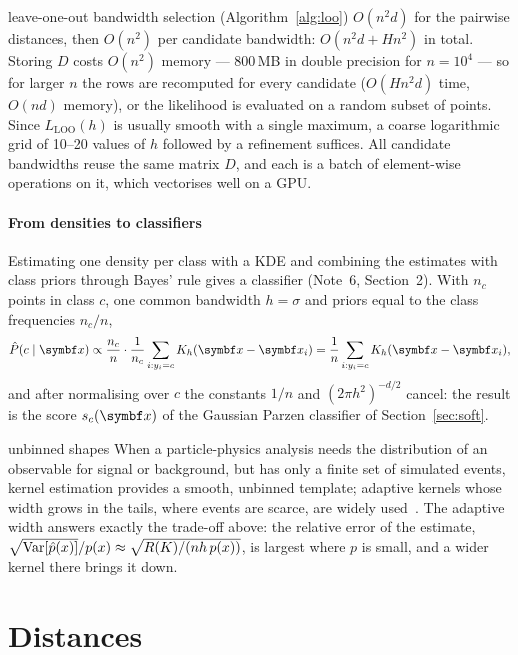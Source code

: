 \documentclass[11pt]{article}
\begin{document}
\begin{runtime}{leave-one-out bandwidth selection (Algorithm~\ref{alg:loo})}
$O(n^2 d)$ for the pairwise distances, then $O(n^2)$ per candidate bandwidth: $O(n^2 d + Hn^2)$ in total. Storing
$D$ costs $O(n^2)$ memory --- 800\,MB in double precision for $n = 10^4$ --- so for larger $n$ the rows are recomputed
for every candidate ($O(Hn^2 d)$ time, $O(nd)$ memory), or the likelihood is evaluated on a random subset of points.
Since $L_{\mathrm{LOO}}(h)$ is usually smooth with a single maximum, a coarse logarithmic grid of 10--20 values of $h$
followed by a refinement suffices. All candidate bandwidths reuse the same matrix $D$, and each is a batch of
element-wise operations on it, which vectorises well on a GPU.
\end{runtime}

\paragraph{From densities to classifiers} Estimating one density per class with a KDE and combining the
estimates with class priors through Bayes' rule gives a classifier (Note~6, Section~2). With $n_c$ points in class
$c$, one common bandwidth $h = \sigma$ and priors equal to the class frequencies $n_c/n$,
\[
  \hat P(c \mid \x) \propto \frac{n_c}{n} \cdot \frac{1}{n_c} \sum_{i : y_i = c} K_h(\x - \x_i)
  = \frac{1}{n} \sum_{i : y_i = c} K_h(\x - \x_i) ,
\]
and after normalising over $c$ the constants $1/n$ and $(2\pi h^2)^{-d/2}$ cancel: the result is the score $s_c(\x)$
of the Gaussian Parzen classifier of Section~\ref{sec:soft}.

\begin{physics}{unbinned shapes}
When a particle-physics analysis needs the distribution of an observable for signal or background, but has only a
finite set of simulated events, kernel estimation provides a smooth, unbinned template; adaptive kernels whose width
grows in the tails, where events are scarce, are widely used~\cite{cranmer2001}. The adaptive width answers
exactly the trade-off above: the relative error of the estimate, $\sqrt{\operatorname{Var}[\hat p(x)]}/p(x) \approx
\sqrt{R(K)/(nh\,p(x))}$, is largest where $p$ is small, and a wider kernel there brings it down.
\end{physics}

\section{Distances}\label{sec:distances}
\end{document}
